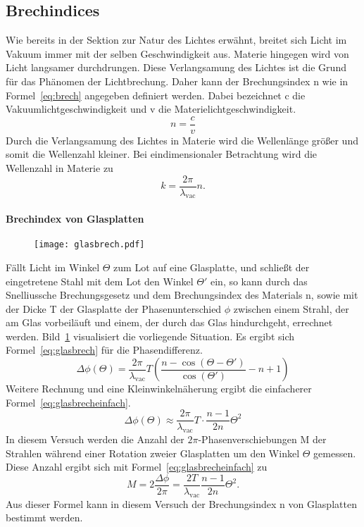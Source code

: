 \subsection{Brechindices}
Wie bereits in der Sektion zur Natur des Lichtes erwähnt, 
breitet sich Licht im Vakuum immer mit der selben Geschwindigkeit 
aus. Materie hingegen wird von Licht langsamer durchdrungen. 
Diese Verlangsamung des Lichtes ist die Grund für das Phänomen der 
Lichtbrechung. Daher kann der Brechungsindex n wie in 
Formel~\eqref{eq:brech} 
angegeben definiert werden. Dabei bezeichnet c die 
Vakuumlichtgeschwindigkeit und v die Materielichtgeschwindigkeit.
\begin{equation}
n = \frac{c}{v}
\label{eq:brech}
\end{equation}
Durch die Verlangsamung des Lichtes in Materie wird die Wellenlänge 
größer und somit die Wellenzahl kleiner. Bei eindimensionaler 
Betrachtung wird die Wellenzahl in Materie zu
\begin{equation*}
k = \frac{2\pi}{\lambda_\text{vac}}n.
\end{equation*}
\paragraph{Brechindex von Glasplatten}
%
\begin{figure}
\centering
\texttt{[image: glasbrech.pdf]}
\label{fig:brechglas}
\end{figure}
%
Fällt Licht im Winkel $\Theta$ zum Lot auf eine Glasplatte, 
und schließt der eingetretene Stahl mit dem Lot den Winkel $\Theta'$ ein, 
so kann durch das 
Snelliussche Brechungsgesetz und dem Brechungsindex des Materials n, 
sowie mit der Dicke T der Glasplatte der Phasenunterschied $\phi$ zwischen 
einem Strahl, der am Glas vorbeiläuft und einem, der durch das Glas 
hindurchgeht, errechnet werden. 
Bild~\ref{fig:brechglas} visualisiert die vorliegende Situation.
Es ergibt sich 
Formel~\eqref{eq:glasbrech} für die Phasendifferenz.
\begin{equation}
\Delta\phi(\Theta) = \frac{2\pi}{\lambda_\text{vac}}T\left(
\frac{n-\cos(\Theta - \Theta')}{\cos(\Theta')} - n+1\right)
\label{eq:glasbrech}
\end{equation}
Weitere Rechnung und eine Kleinwinkelnäherung ergibt die einfacherer 
Formel~\eqref{eq:glasbrecheinfach}.
\begin{equation}
\Delta\phi(\Theta) \approx \frac{2\pi}{\lambda_\text{vac}}T\cdot
\frac{n-1}{2n}\Theta^2
\label{eq:glasbrecheinfach}
\end{equation}
In diesem Versuch werden die Anzahl der $2\pi$-Phasenverschiebungen M
der Strahlen während einer Rotation zweier Glasplatten um den Winkel 
$\Theta$ gemessen. Diese Anzahl ergibt sich mit 
Formel~\eqref{eq:glasbrecheinfach} zu
\begin{equation}
M = 2\frac{\Delta\phi}{2\pi} = \frac{2T}{\lambda_\text{vac}}
\frac{n-1}{2n}\Theta^2.
\label{eq:glasfringes}
\end{equation}
Aus dieser Formel kann in diesem Versuch der Brechungsindex n von 
Glasplatten bestimmt werden.\\
